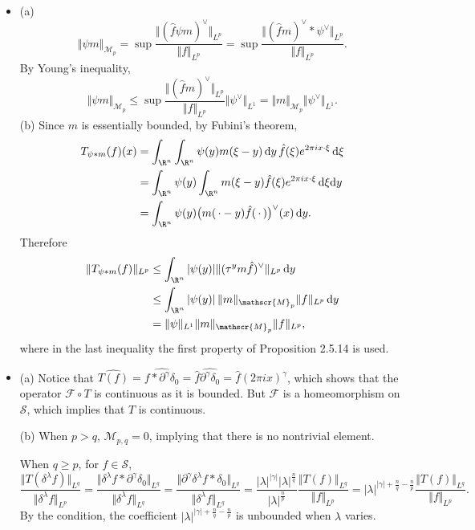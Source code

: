\begin{itemize}
\item[2.5.3]
(a)$$\Vert \psi m\Vert_{\mathscr{M}_{p}}=\sup\frac{\Vert(\hat{f}\psi m)^\vee\Vert_{L^p}}{\Vert f\Vert_{L^p}}=\sup\frac{\Vert(\hat{f}m)^\vee*\psi^\vee\Vert_{L^p}}{\Vert f\Vert_{L^p}}.$$
By Young's inequality,
$$\Vert \psi m\Vert_{\mathscr{M}_{p}}
\leq \sup\frac{\Vert(\hat{f} m)^\vee\Vert_{L^p}}{\Vert f\Vert_{L^p}}\Vert \psi^\vee\Vert _{L^1}
=\Vert m\Vert _{\mathscr{M}_{p}}\Vert \psi^\vee\Vert_{L^1}.$$
(b) Since $m$ is essentially bounded, by Fubini's theorem, 
\begin{align*}
    T_{\psi*m}(f)(x)&=\int_{\R^n} \int_{\R^n} \psi(y)m(\xi-y)\,\mathrm{d}y \,\hat{f}(\xi)e^{2\pi i x\cdot\xi}\,\mathrm{d}\xi\\
    &=\int_{\R^n} \psi(y)\int_{\R^n} m(\xi-y) \hat{f}(\xi)e^{2\pi i x\cdot\xi}\,\mathrm{d}\xi\mathrm{d}y\\
    &=\int_{\R^n} \psi(y)\big(m(\,\cdot-y)\hat{f}(\,\cdot\,)\big)^\vee(x)\,\mathrm{d}y.
\end{align*}
Therefore 
\begin{align*}
    \Vert T_{\psi*m}(f)\Vert _{L^p}&\leq \int_{\R^n} \vert \psi(y)\vert \Vert (\tau^ym\hat{f})^\vee\Vert_{L^p}\,\mathrm{d}y\\
    &\leq \int_{\R^n} \left\vert \psi(y) \right\vert \Vert m\Vert _{\mathscr{M}_p}\Vert f\Vert _{L^p}\,\mathrm{d}y\\
    &=\Vert \psi\Vert_{L^1}\Vert m\Vert _{\mathscr{M}_p}\Vert f\Vert _{L^p},
\end{align*}
where in the last inequality the first property of Proposition 2.5.14 is used.
\item[2.5.4]
(a)
Notice that $\widehat{T(f)} = \widehat{f * \partial^{\gamma}\delta_{0}} 
= \hat{f}\widehat{\partial^{\gamma}\delta_{0}} = \hat{f}(2\pi ix)^{\gamma}$, 
which shows that the operator $\mathscr{F} \circ T$ is continuous 
as it is bounded. But $\mathscr{F}$ is a homeomorphism on $\mathscr{S}$,
which implies that $T$ is continuous.

(b)
When $p>q$, $\mathscr{M}_{p,q}=0$, implying that there is no nontrivial element.

When $q\geq p$, for $f\in \mathscr{S}$,
\[\frac{\Vert T(\delta^{\lambda} f)\Vert_{L^q}}{\Vert \delta ^\lambda f \Vert_{L^p}}
= \frac{\Vert \delta^{\lambda} f * \partial^{\gamma}\delta_{0} \Vert_{L^q}}
{\Vert \delta^{\lambda} f \Vert_{L^q}}
= \frac{\Vert \partial^{\gamma}{\delta^{\lambda} f} * \delta_{0} \Vert_{L^q}}
{\Vert \delta^{\lambda} f \Vert_{L^q}}
= \frac{|\lambda|^{|\gamma|}|\lambda|^{\frac{n}{q}}}{|\lambda|^{\frac{n}{p}}}\frac{\Vert T(f)\Vert_{L^q}}{\Vert f \Vert_{L^p}}
=|\lambda|^{|\gamma|+\frac{n}{q}-\frac{n}{p}}\frac{\Vert T(f)\Vert_{L^q}}{\Vert f \Vert_{L^p}}.\]
By the condition, the coefficient $|\lambda|^{|\gamma|+\frac{n}{q}-\frac{n}{p}}$ 
is unbounded when $\lambda$ varies.


\end{itemize}
